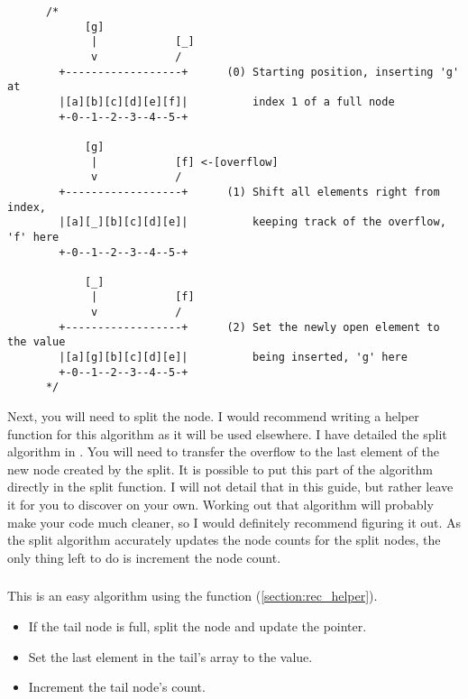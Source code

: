 \begin{verbatim}
      /*
            [g]
             |            [_]
             v            /
        +------------------+      (0) Starting position, inserting 'g' at
        |[a][b][c][d][e][f]|          index 1 of a full node
        +-0--1--2--3--4--5-+

            [g]
             |            [f] <-[overflow]
             v            /
        +------------------+      (1) Shift all elements right from index,
        |[a][_][b][c][d][e]|          keeping track of the overflow, 'f' here
        +-0--1--2--3--4--5-+

            [_]
             |            [f]
             v            /
        +------------------+      (2) Set the newly open element to the value
        |[a][g][b][c][d][e]|          being inserted, 'g' here
        +-0--1--2--3--4--5-+
      */
\end{verbatim}

\indent Next, you will need to split the node.
I would recommend writing a helper function for this algorithm as it
will be used elsewhere. I have detailed the split algorithm in .
You will need to transfer the overflow to the last element of the new
node created by the split. It is possible to put this part of the
algorithm directly in the split function. I will not detail that in
this guide, but rather leave it for you to discover on your own.
Working out that algorithm will probably make your code much cleaner,
so I would definitely recommend figuring it out.
As the split algorithm accurately updates the node counts for the split
nodes, the only thing left to do is increment the node count.




\subsubsection{}
\indent This is an easy algorithm using the   function (\ref{section:rec_helper}).

\begin{itemize}
	\item If the tail node is full, split the node and update the  pointer.
	\item Set the last element in the tail's array to the value.
	\item Increment the tail node's count.
\end{itemize}

